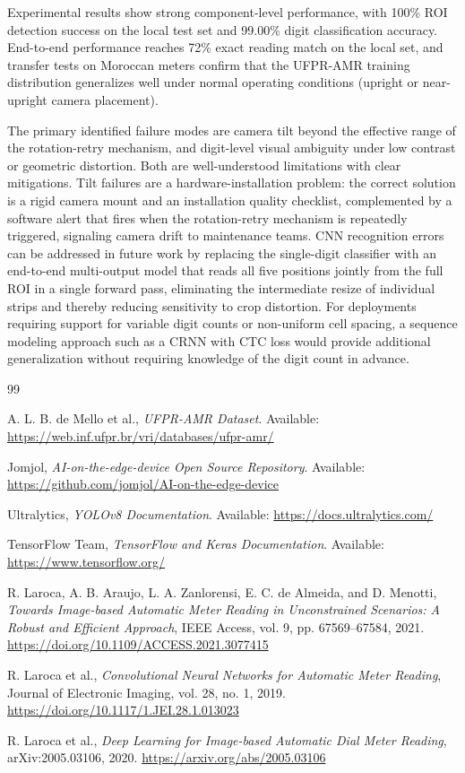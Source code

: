 \documentclass[11pt,a4paper]{article}
\begin{document}
Experimental results show strong component-level performance, with 100\% ROI detection success on the local test set and 99.00\% digit classification accuracy. End-to-end performance reaches 72\% exact reading match on the local set, and transfer tests on Moroccan meters confirm that the UFPR-AMR training distribution generalizes well under normal operating conditions (upright or near-upright camera placement).

The primary identified failure modes are camera tilt beyond the effective range of the rotation-retry mechanism, and digit-level visual ambiguity under low contrast or geometric distortion. Both are well-understood limitations with clear mitigations. Tilt failures are a hardware-installation problem: the correct solution is a rigid camera mount and an installation quality checklist, complemented by a software alert that fires when the rotation-retry mechanism is repeatedly triggered, signaling camera drift to maintenance teams. CNN recognition errors can be addressed in future work by replacing the single-digit classifier with an end-to-end multi-output model that reads all five positions jointly from the full ROI in a single forward pass, eliminating the intermediate resize of individual strips and thereby reducing sensitivity to crop distortion. For deployments requiring support for variable digit counts or non-uniform cell spacing, a sequence modeling approach such as a CRNN with CTC loss would provide additional generalization without requiring knowledge of the digit count in advance.

\begin{thebibliography}{99}

A. L. B. de Mello et al., \emph{UFPR-AMR Dataset}. Available: \url{https://web.inf.ufpr.br/vri/databases/ufpr-amr/}

Jomjol, \emph{AI-on-the-edge-device Open Source Repository}. Available: \url{https://github.com/jomjol/AI-on-the-edge-device}

Ultralytics, \emph{YOLOv8 Documentation}. Available: \url{https://docs.ultralytics.com/}

TensorFlow Team, \emph{TensorFlow and Keras Documentation}. Available: \url{https://www.tensorflow.org/}

R. Laroca, A. B. Araujo, L. A. Zanlorensi, E. C. de Almeida, and D. Menotti, \emph{Towards Image-based Automatic Meter Reading in Unconstrained Scenarios: A Robust and Efficient Approach}, IEEE Access, vol. 9, pp. 67569--67584, 2021. \url{https://doi.org/10.1109/ACCESS.2021.3077415}

R. Laroca et al., \emph{Convolutional Neural Networks for Automatic Meter Reading}, Journal of Electronic Imaging, vol. 28, no. 1, 2019. \url{https://doi.org/10.1117/1.JEI.28.1.013023}

R. Laroca et al., \emph{Deep Learning for Image-based Automatic Dial Meter Reading}, arXiv:2005.03106, 2020. \url{https://arxiv.org/abs/2005.03106}

\end{thebibliography}
\end{document}
